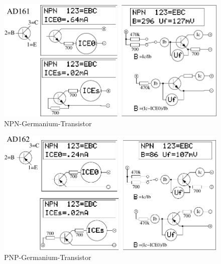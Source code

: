 \begin{figure}[H]
\centering
\includegraphics[]{../FIG/BJT_AD161.pdf}
\caption{NPN-Germanium-Transistor}
\label{fig:BJT-NPN-Ge}
\end{figure}


\begin{figure}[H]
\centering
\includegraphics[]{../FIG/BJT_AD162.pdf}
\caption{PNP-Germanium-Transistor}
\label{fig:BJT-PNP-Ge}
\end{figure}

